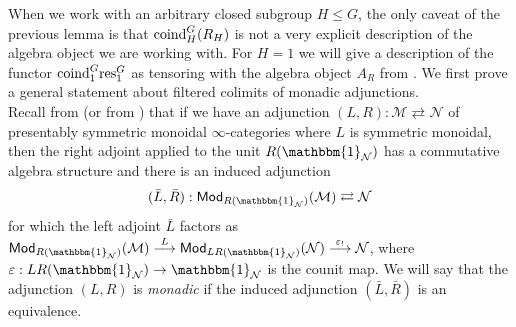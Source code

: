 \documentclass[reqno]{amsart}
\numberwithin{equation}{section}\theoremstyle{thms}
\theoremstyle{defn}
\newcommand{\cM}{\mathcal{M}}
\newcommand{\cN}{\mathcal{N}}
\newcommand{\tn}[1]{\textnormal{#1}}
\newcommand{\tsf}[1]{\textsf{\textup{#1}}}
\newcommand{\bbone}{\mathbbm{1}}
\newcommand{\Mod}{\tsf{Mod}}
\begin{document}
When we work with an arbitrary closed subgroup $H \leq G$, the only caveat of the previous lemma is that $\tn{coind}^G_H(R_H)$ is not a very explicit description of the algebra object we are working with. For $H=1$ we will give a description of the functor $\tn{coind}^G_1\tn{res}^G_1$ as tensoring with the algebra object $A_R$ from . We first prove a general statement about filtered colimits of monadic adjunctions.\\
Recall from \cite[Construction 5.23]{mnn17} (or from ) that if we have an adjunction $(L,R): \cM \rightleftarrows \cN$ of presentably symmetric monoidal $\infty$-categories where $L$ is symmetric monoidal, then the right adjoint applied to the unit $R(\bbone_{\cN})$ has a commutative algebra structure and there is an induced adjunction
$$(\bar{L},\bar{R}): \Mod_{R(\bbone_{\cN})}(\cM) \rightleftarrows \cN$$
for which the left adjoint $\bar{L}$ factors as $\Mod_{R(\bbone_{\cN})}(\cM) \stackrel{L}{\longrightarrow} \Mod_{LR(\bbone_{\cN})}(\cN) \stackrel{\varepsilon_!}{\longrightarrow} \cN$,
where $\varepsilon: LR(\bbone_{\cN}) \to \bbone_{\cN}$ is the counit map. We will say that the adjunction $(L,R)$ is \emph{monadic} if the induced adjunction $(\bar{L},\bar{R})$ is an equivalence.
\end{document}
